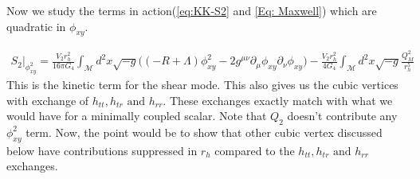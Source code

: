 \documentclass[a4paper,11pt]{article}
\begin{document}
Now we study the terms in action(\ref{eq:KK-S2} and  \ref{Eq: Maxwell}) which are quadratic in $\phi_{xy}$.

\begin{equation}
\begin{aligned}
S_2\big|_ {\phi_{xy}^2}=\frac{V_2 r_h^2}{16\pi G_4}\int_\mathcal{M} d^2x \sqrt{-g}\big ((-R+\Lambda)\phi_{xy}^2-2g^{\mu \nu} \partial_\mu\phi_{xy}\partial_\nu\phi_{xy} \big)-\frac{V_2 r_h^2}{4G_4}\int_\mathcal{M} d^2x \sqrt{-g} \frac{Q_M^2}{r_h^5}
\end{aligned}
\label{eq:KK-kin-xy2}
\end{equation}
This is the kinetic term for the shear mode. This also gives us the cubic vertices with exchange of $h_{tt}, h_{tr} \text{ and } h_{rr}$. These exchanges exactly match with what we would have for a minimally coupled scalar. Note that $Q_2$ doesn't contribute any $\phi_{xy}^2$ term. Now, the point would be to show that other cubic vertex discussed below have contributions suppressed in $r_h$ compared to the $h_{tt}, h_{tr} \text{ and } h_{rr}$ exchanges.
\end{document}
